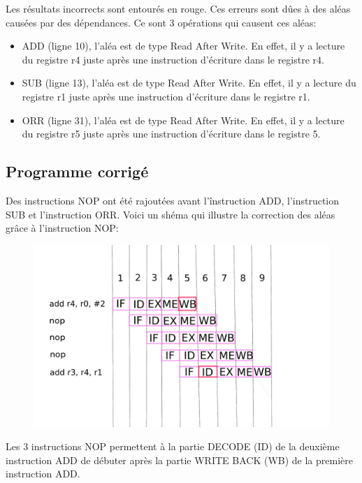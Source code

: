 \documentclass[a4paper]{article} %
\begin{document}
Les résultats incorrects sont entourés en rouge.
Ces erreurs sont dûes à des aléas causées par des dépendances. Ce sont 3 opérations qui causent ces aléas:
\begin{itemize}
    \item ADD (ligne 10), l'aléa est de type Read After Write. En effet, il y a lecture du registre r4 juste après une instruction d'écriture dans le registre r4.
    \item SUB (ligne 13), l'aléa est de type Read After Write. En effet, il y a lecture du registre r1 juste après une instruction d'écriture dans le registre r1.
    \item ORR (ligne 31), l'aléa est de type Read After Write. En effet, il y a lecture du registre r5 juste après une instruction d'écriture dans le registre 5.
\end{itemize}
\subsection{Programme corrigé}

Des instructions NOP ont été rajoutées avant l'înstruction ADD, l'instruction SUB et l'instruction ORR.
Voici un shéma qui illustre la correction des aléas grâce à l'instruction NOP:
\begin{figure}[H]
    \centering
    \includegraphics[width=.8\textwidth]{src/ZELE.jpeg}
    \label{fig:nope_zele_pic}
\end{figure}
Les 3 instructions NOP permettent à la partie DECODE (ID) de la deuxième instruction ADD de débuter après la partie WRITE BACK (WB) de la première instruction ADD.
\end{document}
